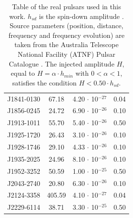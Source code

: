 \documentclass[11pt,a4paper,final]{iopart}
\begin{document}
\begin{table}[h!]
\begin{tabular}[t]{c|ccc}
J1841-0130 & 67.18  & 4.20 $\cdot$ 10$^{-27 }$ & 0.04 \\
J1856-0245 & 24.72  & 6.90 $\cdot$ 10$^{-26}$& 0.10 \\
J1913-1011 & 55.70  & 5.40 $\cdot$ 10$^{-26}$& 0.50 \\
J1925-1720 & 26.43  & 3.10 $\cdot$ 10$^{-26}$& 0.10 \\
J1928-1746 & 29.10  & 4.33 $\cdot$ 10$^{-26}$& 0.10 \\
J1935-2025 & 24.96  & 8.10 $\cdot$ 10$^{-26}$& 0.10 \\
J1952-3252 & 50.59  & 1.00 $\cdot$ 10$^{-25}$& 0.50 \\
J2043-2740 & 20.80  & 6.30 $\cdot$ 10$^{-26}$ & 0.10 \\
J2124-3358 & 405.59 & 4.10 $\cdot$ 10$^{-27}$ & 0.04 \\
J2229-6114 & 38.71  & 3.30 $\cdot$ 10$^{-25}$ & 0.50\\
\bottomrule
\end{tabular}
 \caption{ Table of the real pulsars used in this work. $h_{sd}$ is the spin-down amplitude \cite{JKS,narrowband}. Source parameters (position, distance, frequency and frequency evolution) are taken from the Australia Telescope National Facility (ATNF) Pulsar Catalogue \cite{atnf}. The injected amplitude $H$, equal to $H=\alpha\cdot h_{min}$ with $0<\alpha<1$, satisfies the condition $H< 0.50\cdot h_{sd}$. }
\label{realpuls}
\end{table}
\clearpage
\end{document}
